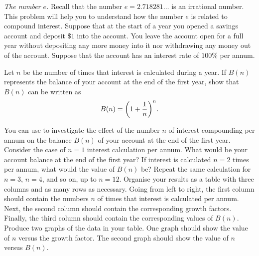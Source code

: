 \documentclass[a4paper,oneside,12pt]{article}
\begin{document}
\begin{problem}
\item\label{prob:exponential:number_e}
  \emph{The number $e$.}
  Recall that the number $e = 2.718281\dots$ is an irrational number.
  This problem will help you to understand how the number $e$ is
  related to compound interest.  Suppose that at the start of a year
  you opened a savings account and deposit $\$1$ into the account.
  You leave the account open for a full year without depositing any
  more money into it nor withdrawing any money out of the account.
  Suppose that the account has an interest rate of $100\%$ per annum.
  \begin{packedenum}
  \item\label{subprob:exponential:e_balance_formula}
    Let $n$ be the number of times that interest is calculated during
    a year.  If $B(n)$ represents the balance of your account at the
    end of the first year, show that $B(n)$ can be written as
    \begin{equation}
    \label{eqn:exponential:e_savings_first_year_n_compounding}
    B(n)
    =
    \parenthesis*{
      1 + \frac{1}{n}
    }^n.
    \end{equation}

  \item\label{subprob:exponential:e_balance_up_to_12_compounding}
    You can use
     to
    investigate the effect of the number $n$ of interest compounding
    per annum on the balance $B(n)$ of your account at the end of the
    first year.  Consider the case of $n = 1$ interest calculation per
    annum.  What would be your account balance at the end of the first
    year?  If interest is calculated $n = 2$ times per annum, what
    would the value of $B(n)$ be?  Repeat the same calculation for
    $n = 3$, $n = 4$, and so on, up to $n = 12$.  Organise your
    results as a table with three columns and as many rows as
    necessary.  Going from left to right, the first column should
    contain the numbers $n$ of times that interest is calculated per
    annum.  Next, the second column should contain the corresponding
    growth factors.  Finally, the third column should contain the
    corresponding values of $B(n)$.  Produce two graphs of the data in
    your table.  One graph should show the value of $n$ versus the
    growth factor.  The second graph should show the value of $n$
    versus $B(n)$.


\end{packedenum}
\end{problem}
\end{document}
